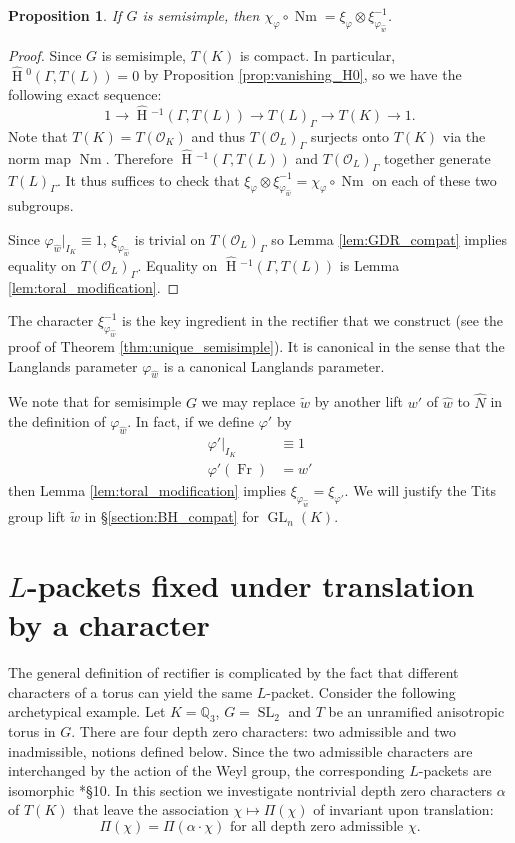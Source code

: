 \documentclass{mrlart7}
\theoremstyle{plain}
\newtheorem{proposition}[theorem]{Proposition}
\newcommand{\HT}[1]{\hat{\HH}{}^{#1}}
\theoremstyle{definition}
\numberwithin{equation}{section}
\DeclareMathOperator{\HH}{H}
\DeclareMathOperator{\Nm}{Nm}
\DeclareMathOperator{\Fr}{Fr}
\DeclareMathOperator{\GL}{GL}
\DeclareMathOperator{\SL}{SL}
\newcommand{\OK}{\mathcal{O}_K}
\newcommand{\OL}{\mathcal{O}_L}
\newcommand{\QQ}{\mathbb{Q}}
\begin{document}
\begin{proposition}\label{prop:existenceofrectifier}
If $G$ is semisimple, then $\chi_{\varphi} \circ \Nm = \xi_{\varphi} \otimes \xi_{\varphi_{\hat{w}}}^{-1}$.
\end{proposition}

\begin{proof}
Since $G$ is semisimple, $T(K)$ is compact.  In particular,
$\HT{0}(\Gamma, T(L)) = 0$ by Proposition \ref{prop:vanishing_H0},
so we have the following exact sequence:
$$1 \rightarrow \HT{-1}(\Gamma, T(L)) \rightarrow T(L)_{\Gamma} \rightarrow T(K) \rightarrow 1.$$
Note that $T(K) = T(\OK)$ and thus
$T(\OL)_{\Gamma}$ surjects onto $T(K)$ via the norm map
$\Nm$.  Therefore $\HT{-1}(\Gamma,T(L))$ and
$T(\OL)_{\Gamma}$ together generate $T(L)_{\Gamma}$.  It thus suffices to check that
$\xi_{\varphi} \otimes \xi_{\varphi_{\hat{w}}}^{-1} = \chi_{\varphi} \circ \Nm$
on each of these two subgroups.

Since $\varphi_{\hat{w}}|_{I_K} \equiv 1$, $\xi_{\varphi_{\hat{w}}}$ is trivial on
$T(\OL)_{\Gamma}$ so Lemma
\ref{lem:GDR_compat} implies equality on $T(\OL)_{\Gamma}$.
Equality on $\HT{-1}(\Gamma,T(L))$ is Lemma \ref{lem:toral_modification}.
\end{proof}

The character $\xi_{\varphi_{\hat{w}}}^{-1}$ is the key ingredient in the rectifier that we construct
(see the proof of Theorem \ref{thm:unique_semisimple}).  It is canonical in the sense that the
Langlands parameter $\varphi_{\hat{w}}$ is a canonical Langlands parameter.

We note that for semisimple $G$ we may replace $\tilde{w}$ by another
lift $w'$ of $\hat{w}$ to $\hat{N}$ in the definition of $\varphi_{\hat{w}}$.
In fact, if we define $\varphi'$ by
\begin{align*}
\varphi'|_{I_K} &\equiv 1 \\
\varphi'(\Fr) &= w'
\end{align*}
then Lemma \ref{lem:toral_modification} implies $\xi_{\varphi_{\hat{w}}} = \xi_{\varphi'}$.
We will justify the Tits group lift $\tilde{w}$ in \S\ref{section:BH_compat} for $\GL_n(K)$.

\section{$L$-packets fixed under translation by a character}\label{Q_T}

The general definition of rectifier is complicated by the fact that different
characters of a torus can yield the same $L$-packet.  Consider the following archetypical example.
Let $K = \QQ_3$, $G = \SL_2$ and $T$ be an unramified anisotropic torus in $G$.  There are four depth zero
characters: two admissible and two inadmissible, notions defined below.  Since the two admissible characters are interchanged
by the action of the Weyl group, the corresponding $L$-packets are isomorphic \cite{murnaghan:11}*{\S10}.
In this section we investigate nontrivial depth zero characters $\alpha$ of $T(K)$ that leave the association
$\chi \mapsto \Pi(\chi)$ of \cite{reeder-debacker:09a} invariant upon translation:
$$\Pi(\chi) = \Pi(\alpha\cdot\chi) \mbox{ for all depth zero admissible $\chi$}.$$
\end{document}
